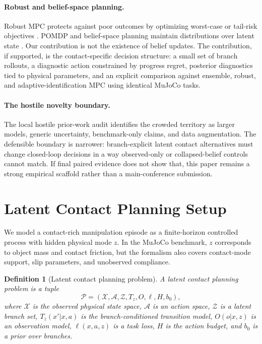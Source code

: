 \documentclass{article}
\newtheorem{definition}{Definition}
\newcommand{\latent}{z}
\newcommand{\obs}{o}
\newcommand{\act}{a}
\newcommand{\state}{x}
\newcommand{\loss}{\ell}
\newcommand{\horizon}{H}
\begin{document}
\paragraph{Robust and belief-space planning.}
Robust MPC protects against poor outcomes by optimizing worst-case or tail-risk objectives \citep{mayne2000mpc}.  POMDP and belief-space planning maintain distributions over latent state \citep{kaelbling1998planning}.  Our contribution is not the existence of belief updates.  The contribution, if supported, is the contact-specific decision structure: a small set of branch rollouts, a diagnostic action constrained by progress regret, posterior diagnostics tied to physical parameters, and an explicit comparison against ensemble, robust, and adaptive-identification MPC using identical MuJoCo tasks.

\paragraph{The hostile novelty boundary.}
The local hostile prior-work audit identifies the crowded territory as larger models, generic uncertainty, benchmark-only claims, and data augmentation.  The defensible boundary is narrower: branch-explicit latent contact alternatives must change closed-loop decisions in a way observed-only or collapsed-belief controls cannot match.  If final paired evidence does not show that, this paper remains a strong empirical scaffold rather than a main-conference submission.

\section{Latent Contact Planning Setup}

We model a contact-rich manipulation episode as a finite-horizon controlled process with hidden physical mode $\latent$.  In the MuJoCo benchmark, $\latent$ corresponds to object mass and contact friction, but the formalism also covers contact-mode support, slip parameters, and unobserved compliance.

\begin{definition}[Latent contact planning problem]
A latent contact planning problem is a tuple
\[
  \mathcal{P} = (\mathcal{X}, \mathcal{A}, \mathcal{Z}, T_{\latent}, O, \loss, \horizon, b_0),
\]
where $\mathcal{X}$ is the observed physical state space, $\mathcal{A}$ is an action space, $\mathcal{Z}$ is a latent branch set, $T_{\latent}(\state'|\state,\act)$ is the branch-conditioned transition model, $O(\obs|\state,\latent)$ is an observation model, $\loss(\state,\act,\latent)$ is a task loss, $\horizon$ is the action budget, and $b_0$ is a prior over branches.
\end{definition}
\end{document}
